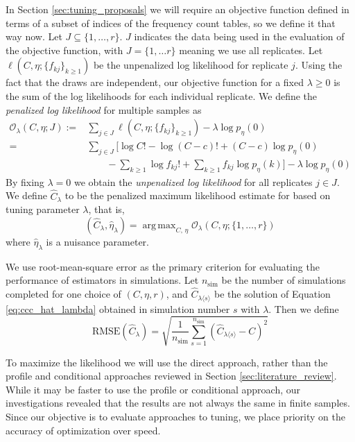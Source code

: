 \documentclass[oupdraft]{bio}
\DeclareMathOperator*{\argmax}{arg\,max}
\begin{document}
In Section \ref{sec:tuning_proposals} we will require an objective function defined in terms of a subset of indices of the frequency count tables, so we define it that way now.  Let $J \subseteq \{1, \dots, r\}$.  $J$ indicates the data being used in the evaluation of the objective function, with $J = \{1, \dots r\}$ meaning we use all replicates.  Let $\ell \left(C, \eta; \{f_{kj}\}_{k \geq 1} \right)$ be the unpenalized log likelihood for replicate $j$.
Using the fact that the draws are independent, our objective function for a fixed $\lambda \geq 0$ is the sum of the log likelihoods for each individual replicate.
We define the \textit{penalized log likelihood} for multiple samples as
\begin{align}
\mathcal{O}_{\lambda}(C, \eta; J) :=& \sum_{j \in J} \ell \left(C, \eta; \{f_{kj}\}_{k \geq 1} \right) - \lambda\log p_{\eta}(0) \\
 =& \sum_{j \in J} \biggl[ \log C! - \log (C-c)! + (C-c) \log p_\eta(0)  \nonumber \\
 & \qquad  - \sum_{k \geq 1} \log{} f_{kj}! + \sum_{k \geq 1} f_{kj} \log p_\eta(k) \biggr] - \lambda \log p_\eta(0)    \label{eq:objective}
\end{align}
By fixing $\lambda = 0$ we obtain the \textit{unpenalized log likelihood} for all replicates $j \in J$.  We define $\widehat{C}_{\lambda}$ to be the penalized maximum likelihood estimate for based on tuning parameter $\lambda$, that is,
\begin{equation}
\left(\widehat{C}_{\lambda},  \widehat{\eta}_{\lambda} \right) = \argmax_{C, \, \eta}  \mathcal{O}_{\lambda} \left(C, \eta ; \{1, \dots , r\} \right) \label{eq:ccc_hat_lambda}
\end{equation}
where $\widehat{\eta}_{\lambda}$ is a nuisance parameter.

We use root-mean-square error as the primary criterion for evaluating the performance of estimators in simulations.  Let $n_{\text{sim}}$ be the number of simulations completed for one choice of $(C, \eta, r)$, and $\widehat{C}_{\lambda \langle s \rangle}$ be the solution of Equation \eqref{eq:ccc_hat_lambda} obtained in simulation number $s$ with  $\lambda$.  Then we define
\begin{equation}
 \text{RMSE}\left( \widehat{C}_{\lambda} \right) = \sqrt{ \frac{1}{n_{\text{sim}}} \sum_{s=1}^{n_{\text{sim}}} \left( \widehat{C}_{\lambda \langle s \rangle} - C\right)^2 }
\end{equation}

To maximize the likelihood we will use the direct approach, rather than the profile and conditional approaches reviewed in Section \ref{sec:literature_review}.  While it may be faster to use the profile or conditional approach, our investigations revealed that the results are not always the same in finite samples.
Since our objective is to evaluate approaches to tuning, we place priority on the accuracy of optimization over speed.
\end{document}
